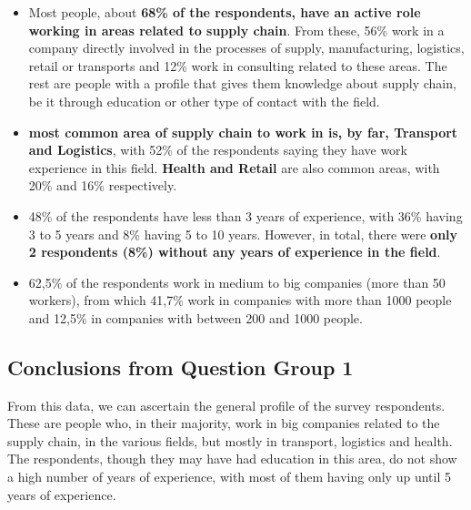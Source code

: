 \begin{itemize}
\item Most people, about \textbf{68\% of the respondents, have an active role working in areas related to supply chain}. From these, 56\% work in a company directly involved in the processes of supply, manufacturing, logistics, retail or transports and 12\% work in consulting related to these areas. The rest are people with a profile that gives them knowledge about supply chain, be it through education or other type of contact with the field.
\item \textbf{ most common area of supply chain to work in is, by far, Transport and Logistics}, with 52\% of the respondents saying they have work experience in this field. \textbf{Health and Retail} are also common areas, with 20\% and 16\% respectively.
\item 48\% of the respondents have less than 3 years of experience, with 36\% having 3 to 5 years and 8\% having 5 to 10 years. However, in total, there were \textbf{only 2 respondents (8\%) without any years of experience in the field}.
\item 62,5\% of the respondents work in medium to big companies (more than 50 workers), from which 41,7\% work in companies with more than 1000 people and 12,5\% in companies with between 200 and 1000 people.
\end{itemize}

\subsection*{Conclusions from Question Group 1}

From this data, we can ascertain the general profile of the survey respondents. These are people who, in their majority, work in big companies related to the supply chain, in the various fields, but mostly in transport, logistics and health. The respondents, though they may have had education in this area, do not show a high number of years of experience, with most of them having only up until 5 years of experience.